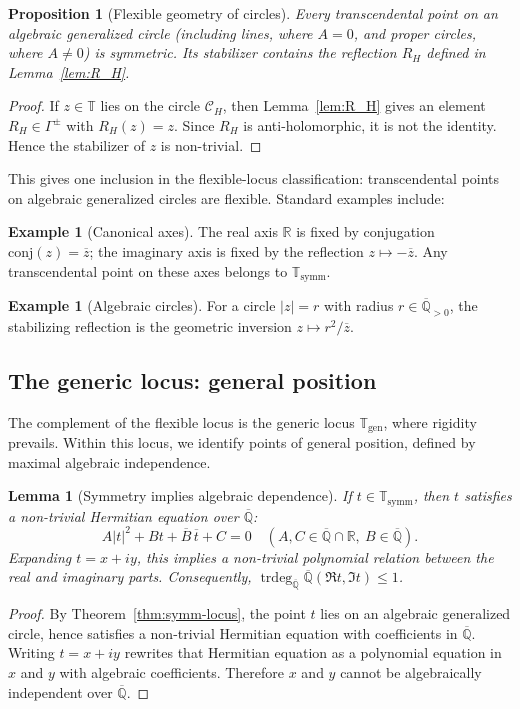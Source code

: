\documentclass[11pt,a4paper]{article}
\theoremstyle{plain}
\newtheorem{lemma}[theorem]{Lemma}
\newtheorem{proposition}[theorem]{Proposition}
\theoremstyle{definition}
\newtheorem{example}[theorem]{Example}
\newcommand{\R}{\mathbb{R}}
\newcommand{\Alg}{\overline{\mathbb{Q}}}
\newcommand{\trans}{\mathbb{T}}
\newcommand{\Tc}{\trans}
\DeclareMathOperator{\trdeg}{trdeg}
\newcommand{\ssymm}{\Tc_{\mathrm{symm}}}
\newcommand{\sgen}{\Tc_{\mathrm{gen}}}
\newcommand{\J}{\mathrm{conj}}
\begin{document}
\begin{proposition}[Flexible geometry of circles]\label{prop:lines-circles-general}
	Every transcendental point on an algebraic generalized circle (including lines, where $A=0$, and proper circles, where $A\ne0$) is symmetric. Its stabilizer contains the reflection $R_H$ defined in Lemma~\ref{lem:R_H}.
\end{proposition}
\begin{proof}
	If $z\in\Tc$ lies on the circle $\mathcal C_H$, then Lemma~\ref{lem:R_H} gives an element $R_H\in\Gamma^{\pm}$ with $R_H(z)=z$. Since $R_H$ is anti-holomorphic, it is not the identity. Hence the stabilizer of $z$ is non-trivial.
\end{proof}

This gives one inclusion in the flexible-locus classification: transcendental points on algebraic generalized circles are flexible. Standard examples include:

\begin{example}[Canonical axes]\label{ex:real-imag}
	The real axis $\R$ is fixed by conjugation $\J(z)=\overline{z}$; the imaginary axis is fixed by the reflection $z\mapsto-\overline z$. Any transcendental point on these axes belongs to $\ssymm$.
\end{example}

\begin{example}[Algebraic circles]\label{ex:algebraic-circles}
	For a circle $|z|=r$ with radius $r\in\Alg_{>0}$, the stabilizing reflection is the geometric inversion $z\mapsto r^2/\overline z$.
\end{example}

\subsection{The generic locus: general position}

The complement of the flexible locus is the generic locus $\sgen$, where rigidity prevails. Within this locus, we identify points of general position, defined by maximal algebraic independence.

\begin{lemma}[Symmetry implies algebraic dependence]\label{lem:symm-dependence}
	If $t\in\ssymm$, then $t$ satisfies a non-trivial Hermitian equation over $\Alg$:
	\[
		A|t|^2+B t+\overline{B}\,\overline t+C=0 \quad (A,C\in\Alg\cap\R,\ B\in\Alg).
	\]
	Expanding $t = x+iy$, this implies a non-trivial polynomial relation between the real and imaginary parts. Consequently, $\trdeg_{\Alg}\Alg(\Re t,\Im t)\le 1$.
\end{lemma}
\begin{proof}
	By Theorem~\ref{thm:symm-locus}, the point $t$ lies on an algebraic generalized circle, hence satisfies a non-trivial Hermitian equation with coefficients in $\Alg$. Writing $t=x+iy$ rewrites that Hermitian equation as a polynomial equation in $x$ and $y$ with algebraic coefficients. Therefore $x$ and $y$ cannot be algebraically independent over $\Alg$.
\end{proof}
\end{document}
